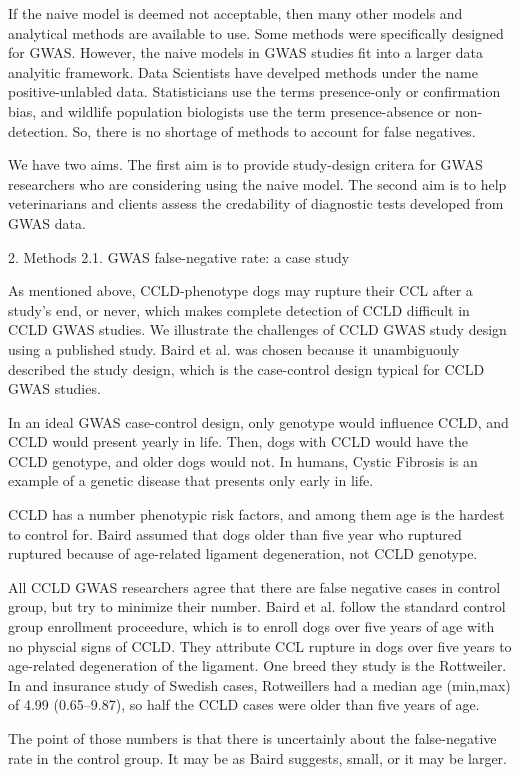 If the naive model is deemed not acceptable, then many other models and analytical methods are available to use. Some methods were specifically designed for GWAS. However, the naive models in GWAS studies fit into a larger data analyitic framework. Data Scientists have develped methods under the name positive-unlabled data. Statisticians use the terms presence-only or confirmation bias, and wildlife population biologists use the term presence-absence or non-detection. So, there is no shortage of methods to account for false negatives.

We have two aims. The first aim is to provide study-design critera for GWAS researchers who are considering using the naive model. The second aim is to help veterinarians and clients assess the credability of diagnostic tests developed from GWAS data.

2. Methods
2.1. GWAS false-negative rate: a case study

As mentioned above, CCLD-phenotype dogs may rupture their CCL after a study's end, or never, which makes complete detection of CCLD difficult in CCLD GWAS studies. We illustrate the challenges of CCLD GWAS study design using a published study. Baird et al. was chosen because it unambiguouly described the study design, which is the case-control design typical for CCLD GWAS studies. 

In an ideal GWAS case-control  design, only genotype would influence CCLD, and CCLD would present yearly in life. Then, dogs with CCLD would have the CCLD genotype, and older dogs would not. In humans, Cystic Fibrosis is an example of a genetic disease that presents only early in life. 

CCLD has a number phenotypic risk factors, and among them age is the hardest to control for. Baird assumed that dogs older than five year who ruptured ruptured because of age-related ligament degeneration, not CCLD genotype.

All CCLD GWAS researchers agree that there are false negative cases in control group, but try to minimize their number. Baird et al. follow the standard control group enrollment proceedure, which is to enroll dogs over five years of age with no physcial signs of CCLD.  They attribute CCL rupture in dogs over five years to age-related degeneration of the ligament. One breed they study is the Rottweiler. In and insurance study of Swedish cases, Rotweillers had a median age (min,max) of 4.99 (0.65–9.87), so half the CCLD cases were older than five years of age.

The point of those numbers is that there is uncertainly about the false-negative rate in the control group. It may be as Baird suggests, small, or it may be larger. 








